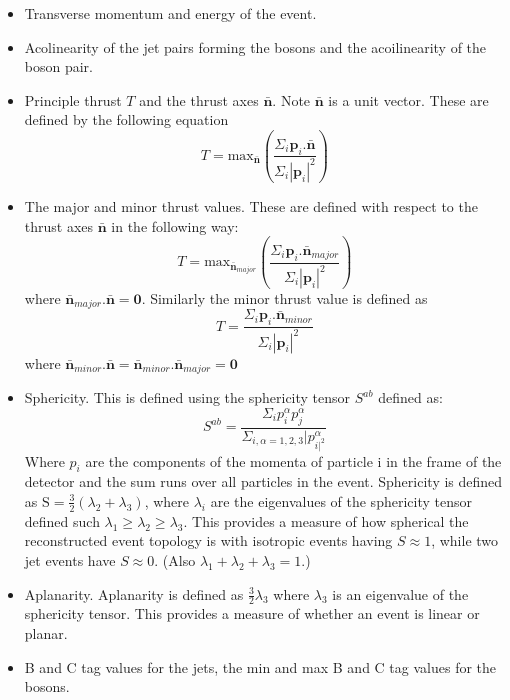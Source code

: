 \begin{itemize}
\item Transverse momentum and energy of the event.
\item Acolinearity of the jet pairs forming the bosons and the acoilinearity of the boson pair.
\item Principle thrust $T$ and the thrust axes $\bar{\textbf{n}}$. Note $\bar{\textbf{n}}$ is a unit vector. These are defined by the following equation
\begin{equation}
T = \text{max}_{\bar{\textbf{n}}} (\frac{\Sigma_{i} \textbf{p}_{i}.\bar{\textbf{n}}}{\Sigma_{i} |\textbf{p}_{i}|^{2}})
\end{equation}
\item The major and minor thrust values. These are defined with respect to the thrust axes $\bar{\textbf{n}}$ in the following way:
\begin{equation}
T = \text{max}_{\bar{\textbf{n}}_{major}} (\frac{\Sigma_{i} \textbf{p}_{i}.\bar{\textbf{n}}_{major}}{\Sigma_{i} |\textbf{p}_{i}|^{2}})
\end{equation}
where $\bar{\textbf{n}}_{major}.\bar{\textbf{n}} = \textbf{0}$. Similarly the minor thrust value is defined as 
\begin{equation}
T = \frac{\Sigma_{i} \textbf{p}_{i}.\bar{\textbf{n}}_{minor}}{\Sigma_{i} |\textbf{p}_{i}|^{2}}
\end{equation}
where $\bar{\textbf{n}}_{minor}.\bar{\textbf{n}} = \bar{\textbf{n}}_{minor}.\bar{\textbf{n}}_{major} =\textbf{0}$
\item Sphericity. This is defined using the sphericity tensor $S^{ab}$ defined as:
\begin{equation}
S^{ab} = \frac{\Sigma_{i}p^{\alpha}_{i}p^{\alpha}_{j}}{\Sigma_{i,\alpha=1,2,3}|p^{\alpha}_{i|^{2}}}
\end{equation}
Where $p_{i}$ are the components of the momenta of particle i in the frame of the detector and the sum runs over all particles in the event. Sphericity is defined as $\text{S} = \frac{3}{2}(\lambda_{2} + \lambda_{3})$, where $\lambda_{i}$ are the eigenvalues of the sphericity tensor defined such $\lambda_{1} \geq \lambda_{2} \geq \lambda_{3}$.  This provides a measure of how spherical the reconstructed event topology is with isotropic events having $S \approx 1$, while two jet events have $S \approx 0$.  (Also $\lambda_{1} + \lambda_{2} + \lambda_{3} = 1$.)
\item Aplanarity. Aplanarity is defined as $\frac{3}{2} \lambda_{3}$ where $\lambda_{3}$ is an eigenvalue of the sphericity tensor.  This provides a measure of whether an event is linear or planar.
\item B and C tag values for the jets, the min and max B and C tag values for the bosons.
\end{itemize}

